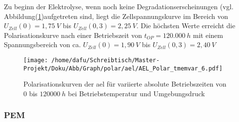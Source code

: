 \documentclass[onecolumn,10pt,titlepage]{article}
\begin{document}
Zu beginn der Elektrolyse, wenn noch keine Degradationserscheinungen (vgl. Abbildung(\ref{fig:polk_ael_tmemvar})aufgetreten sind, liegt die Zellspannungskurve im Bereich von  $U_{Zell}(0)=1,75~V$ bis $U_{Zell}(0,3)=2,25~V$. Die höchsten Werte erreicht die Polarisationskurve nach einer Betriebszeit von $t_{OP}=120.000~h$ mit einem Spannungsbereich von ca. $U_{Zell}(0)=1,90~V$ bis $U_{Zell}(0,3)=2,40~V$
\\

\begin{figure}[H]

	\centering
	\texttt{[image: /home/dafu/Schreibtisch/Master-Projekt/Doku/Abb/Graph/polar/ael/AEL\_Polar\_tmemvar\_6.pdf]}
	\caption[Polarisationskurven der \gls{ael} für variierte absolute Betriebszeiten]{Polarisationskurven der \gls{ael} für variierte absolute Betriebszeiten von $0$ bis $120000~h$ bei Betriebstemperatur und Umgebungsdruck}
	\label{fig:polk_ael_tmemvar}
\end{figure}


\subsubsection*{PEM}
\end{document}
